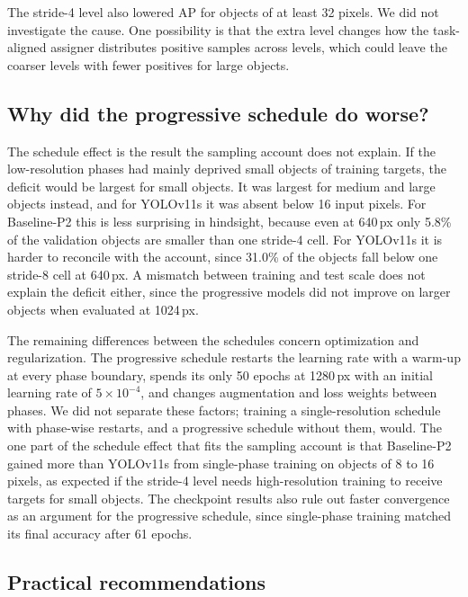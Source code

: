 \documentclass[preprint,12pt]{elsarticle}
\begin{document}
The stride-4 level also lowered AP for objects of at least 32 pixels. We did not
investigate the cause. One possibility is that the extra level changes how the
task-aligned assigner distributes positive samples across levels, which could
leave the coarser levels with fewer positives for large objects.

\subsection{Why did the progressive schedule do worse?}

The schedule effect is the result the sampling account does not explain. If the
low-resolution phases had mainly deprived small objects of training targets, the
deficit would be largest for small objects. It was largest for medium and large
objects instead, and for YOLOv11s it was absent below 16 input pixels. For
Baseline-P2 this is less surprising in hindsight, because even at 640\,px only
5.8\% of the validation objects are smaller than one stride-4 cell. For YOLOv11s it
is harder to reconcile with the account, since 31.0\% of the objects fall below one
stride-8 cell at 640\,px. A mismatch between training and test scale does not
explain the deficit either, since the progressive models did not improve on larger
objects when evaluated at 1024\,px.

The remaining differences between the schedules concern optimization and
regularization. The progressive schedule restarts the learning rate with a warm-up
at every phase boundary, spends its only 50 epochs at 1280\,px with an initial
learning rate of $5\times10^{-4}$, and changes augmentation and loss weights
between phases. We did not separate these factors; training a single-resolution schedule
with phase-wise restarts, and a progressive schedule without them, would. The one
part of the schedule effect that fits the sampling account is that Baseline-P2
gained more than YOLOv11s from single-phase training on objects of 8 to 16 pixels,
as expected if the stride-4 level needs high-resolution training to receive
targets for small objects. The checkpoint results also rule out faster convergence
as an argument for the progressive schedule, since single-phase training matched
its final accuracy after 61 epochs.

\subsection{Practical recommendations}
\end{document}
